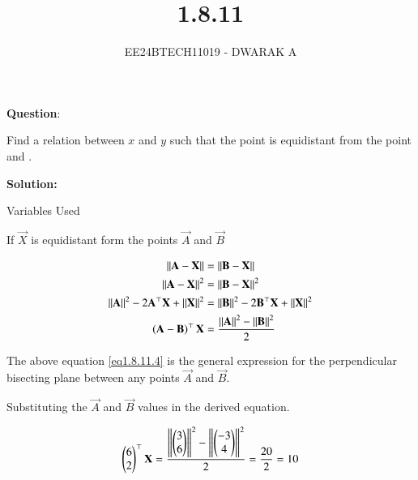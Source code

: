 \documentclass[journal]{IEEEtran}
\begin{document}

\vspace{3cm}

\title{1.8.11}
\author{EE24BTECH11019 - DWARAK A}
{\let\newpage\relax\maketitle}

\renewcommand{\thefigure}{\theenumi}
\renewcommand{\thetable}{\theenumi}
\setlength{\intextsep}{10pt} %


\renewcommand{\thetable}{\theenumi}


\textbf{Question}:

Find a relation between $x$ and $y$ such that the point  is equidistant from the point  and .

\textbf{Solution: }
\begin{table}[h!]    
  \centering
  
  \caption{Variables Used}
  \label{tab1.8.11.1}
\end{table}

If $\vec{X}$ is equidistant form the points $\vec{A}$ and $\vec{B}$

\begin{align}
	\left\lVert\mathbf{A}-\mathbf{X}\right\rVert&=\left\lVert\mathbf{B}-\mathbf{X}\right\rVert \label{eq1.8.11.1}\\
	\left\lVert\mathbf{A}-\mathbf{X}\right\rVert^2&=\left\lVert\mathbf{B}-\mathbf{X}\right\rVert^2 \label{eq1.8.11.2}\\
	\left\lVert\mathbf{A}\right\rVert^2-2\mathbf{A}^\top\mathbf{X}+\left\lVert\mathbf{X}\right\rVert^2&=\left\lVert\mathbf{B}\right\rVert^2-2\mathbf{B}^\top\mathbf{X}+\left\lVert\mathbf{X}\right\rVert^2\label{eq1.8.11.3}\\
	\left(\mathbf{A}-\mathbf{B}\right)^\top\mathbf{X}&=\frac{\left\lVert\mathbf{A}\right\rVert^2-\left\lVert\mathbf{B}\right\rVert^2}{2} \label{eq1.8.11.4}
\end{align}

The above equation \ref{eq1.8.11.4} is the general expression for the perpendicular bisecting plane between any points $\vec{A}$ and $\vec{B}$.

Substituting the $\vec{A}$ and $\vec{B}$ values in the derived equation.

\begin{align}
	\begin{pmatrix}6 \\ 2\end{pmatrix}^\top\mathbf{X} = \frac{\left\lVert\begin{pmatrix}3 \\ 6\end{pmatrix}\right\rVert^2-\left\lVert\begin{pmatrix}-3 \\ 4\end{pmatrix}\right\rVert^2}{2}=\frac{20}{2}=10\label{eq1.8.11.5}
\end{align}
\end{document}
